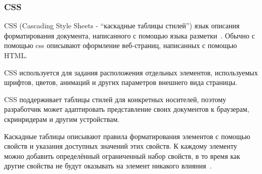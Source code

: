 \subsubsection{CSS}

CSS (Cascading Style Sheets - ``каскадные таблицы стилей'') язык описания форматирования документа, написанного с помощью языка разметки~\cite{CSS}. Обычно с помощью css описывают оформление веб-страниц, написанных с помощью HTML.

CSS используется для задания расположения отдельных элементов, используемых шрифтов, цветов, анимаций и других параметров внешнего вида страницы.

CSS поддерживает таблицы стилей для конкретных носителей, поэтому разработчик может адаптировать представление своих документов к браузерам, скринридерам и другим устройствам.

Каскадные таблицы описывают правила форматирования элементов с помощью свойств и указания доступных значений этих свойств. К каждому элементу можно добавить определённый ограниченный набор свойств, в то время как другие свойства не будут оказывать на элемент никакого влияния~\cite{CSS}.